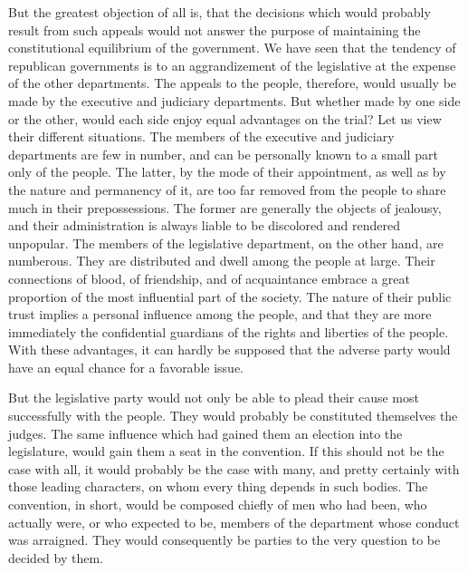 But the greatest objection of all is, that the decisions which would probably result from such appeals would not answer the purpose of maintaining the constitutional equilibrium of the government. We have seen that the tendency of republican governments is to an aggrandizement of the legislative at the expense of the other departments. The appeals to the people, therefore, would usually be made by the executive and judiciary departments. But whether made by one side or the other, would each side enjoy equal advantages on the trial? Let us view their different situations. The members of the executive and judiciary departments are few in number, and can be personally known to a small part only of the people. The latter, by the mode of their appointment, as well as by the nature and permanency of it, are too far removed from the people to share much in their prepossessions. The former are generally the objects of jealousy, and their administration is always liable to be discolored and rendered unpopular. The members of the legislative department, on the other hand, are numberous. They are distributed and dwell among the people at large. Their connections of blood, of friendship, and of acquaintance embrace a great proportion of the most influential part of the society. The nature of their public trust implies a personal influence among the people, and that they are more immediately the confidential guardians of the rights and liberties of the people. With these advantages, it can hardly be supposed that the adverse party would have an equal chance for a favorable issue.

But the legislative party would not only be able to plead their cause most successfully with the people. They would probably be constituted themselves the judges. The same influence which had gained them an election into the legislature, would gain them a seat in the convention. If this should not be the case with all, it would probably be the case with many, and pretty certainly with those leading characters, on whom every thing depends in such bodies. The convention, in short, would be composed chiefly of men who had been, who actually were, or who expected to be, members of the department whose conduct was arraigned. They would consequently be parties to the very question to be decided by them.

